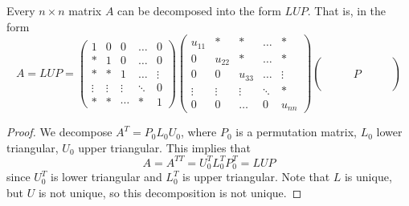   \begin{corollary}
    Every $n \times n$ matrix $A$ can be decomposed into the form $L U P$. That is, in the form
    \begin{equation}
      A = L U P = 
      \begin{pmatrix}
      1 & 0 & 0 & \ldots & 0\\
      * & 1 & 0 & \ldots & 0\\
      * & * & 1 & \ldots & \vdots\\
      \vdots & \vdots & \vdots & \ddots & 0\\
      * & * & \cdots & * & 1 
      \end{pmatrix}
      \begin{pmatrix}
      u_{11} & * & * & \ldots & *\\
      0 & u_{22} & * & \ldots & *\\
      0 & 0 & u_{33} & \ldots & \vdots\\
      \vdots & \vdots & \vdots & \ddots & * \\
      0 & 0 & \ldots & 0 & u_{n n} 
      \end{pmatrix}
      \begin{pmatrix}
      \\
      \\
       & & & P & & & \\
      \\
       & 
      \end{pmatrix}
    \end{equation}
  \end{corollary}
  \begin{proof}
    We decompose $A^T = P_0 L_0 U_0$, where $P_0$ is a permutation matrix, $L_0$ lower triangular, $U_0$ upper triangular. This implies that 
    \begin{equation}
      A = A^{T T} = U_0^T L_0^T P_0^T = L U P
    \end{equation}
    since $U_0^T$ is lower triangular and $L_0^T$ is upper triangular. Note that $L$ is unique, but $U$ is not unique, so this decomposition is not unique. 
  \end{proof}


